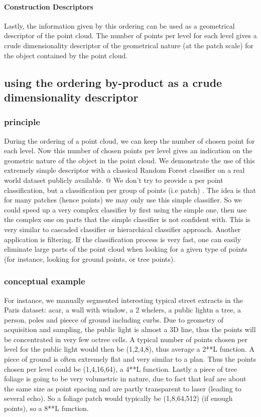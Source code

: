 			\paragraph{Construction Descriptors}
				Lastly, the information given by this ordering can be used as a  geometrical descriptor of the point cloud.
				The number of points per level for each level gives a crude dimensionality descriptor of the geometrical nature (at the patch scale) for the object contained by the point cloud.
				
	\subsection{using the ordering by-product as a crude dimensionality descriptor}
		\subsubsection{principle}
			During the ordering of a point cloud, we can keep the number of chosen point for each level.
			Now this number of chosen points per level gives an indication on the geometric nature of the object in the point cloud. 
			We demonstrate the use of this extremely simple descriptor with a classical Random Forest classifier on a real world dataset publicly available.
			@
			We don't try to provide a per point classification, but a classification per group of points (i.e patch) . 
			The idea is that for many patches (hence points) we may only use this simple classifier. So we could speed up a very complex classifier by first using the simple one, then use the complex one on parts that the simple classifier is not confident with.
			This is very similar to cascaded classifier or hierarchical classifier approach.
			Another application is filtering. If the classification process is very fast, one can easily eliminate large parts of the point cloud when looking for a given type of points (for instance, looking for ground points, or tree points).
		\subsubsection{conceptual example}
			 
			For instance, we manually segmented interesting typical street extracts in the Paris dataset: acar, a wall with window, a 2 whelers, a public lightn a tree, a person, poles and pieece of ground including curbs.
			Due to geometry of acquisition and sampling, the public light is almost a 3D line, thus the points will be concentrated in very few octree cells.
			A typical number of points chosen per level  for the public light would then be (1,2,4,8), thus average a 2**L function.
			A piece of ground is often extremely flat and very similar to a plan.
			Thus the points chosen per level could be (1,4,16,64), a 4**L function.
			Lastly a piece of tree foliage is going to be very volumetric in nature, due to fact that leaf are about the same size as point spacing and are partly transparent to laser (leading to several echo).
			So a foliage patch would typically be (1,8,64,512) (if enough points), so a 8**L function.
			

